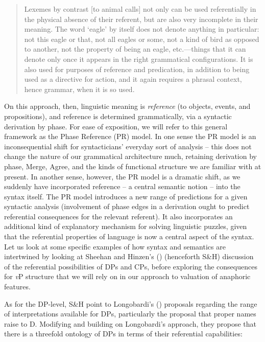 \documentclass[output=paper
,modfonts
,nonflat
]{langsci/langscibook}
\begin{document}
\begin{quote}
Lexemes by contrast [to animal calls] not only can be used referentially in the physical absence of their referent, but are also very incomplete in their meaning. The word ‘eagle’ by itself does not denote anything in particular: not this eagle or that, not all eagles or some, not a kind of bird as opposed to another, not the property of being an eagle, etc.—things that it can denote only once it appears in the right grammatical configurations. It is also used for purposes of reference and predication, in addition to being used as a directive for action, and it again requires a phrasal context, hence grammar, when it is so used.\hbox{}\hfill\hbox{\citep[42--43]{HinzenSheehan:2013}}
\end{quote}\largerpage

\noindent On this approach, then, linguistic meaning is \textit{reference} (to objects, events, and propositions), and reference is determined grammatically, via a syntactic derivation by phase. For ease of exposition, we will refer to this general framework as the Phase Reference (PR) model. In one sense the PR model is an inconsequential shift for syntacticians’ everyday sort of analysis -- this does not change the nature of our grammatical architecture much, retaining derivation by phase, Merge, Agree, and the kinds of functional structure we are familiar with at present. In another sense, however, the PR model is a dramatic shift, as we suddenly have incorporated reference -- a central semantic notion -- into the syntax itself. The PR model introduces a new range of predictions for a given syntactic analysis (involvement of phase edges in a derivation ought to predict referential consequences for the relevant referent). It also incorporates an additional kind of explanatory mechanism for solving linguistic puzzles, given that the referential properties of language is now a central aspect of the syntax. Let us look at some specific examples of how syntax and semantics are intertwined by looking at Sheehan and Hinzen’s (\citeyear{SheehanHinzen:2011}) (henceforth S\&H) discussion of the referential possibilities of DPs and CPs, before exploring the consequences for \textit{v}P structure that we will rely on in our approach to valuation of anaphoric features.  

As for the DP-level, S\&H point to Longobardi’s (\citeyear{Longobardi:1994,Longobardi:2005}) proposals regarding the range of interpretations available for DPs, particularly the proposal that proper names raise to D. Modifying and building on Longobardi’s approach, they propose that there is a threefold ontology of DPs in terms of their referential capabilities: 
\end{document}
